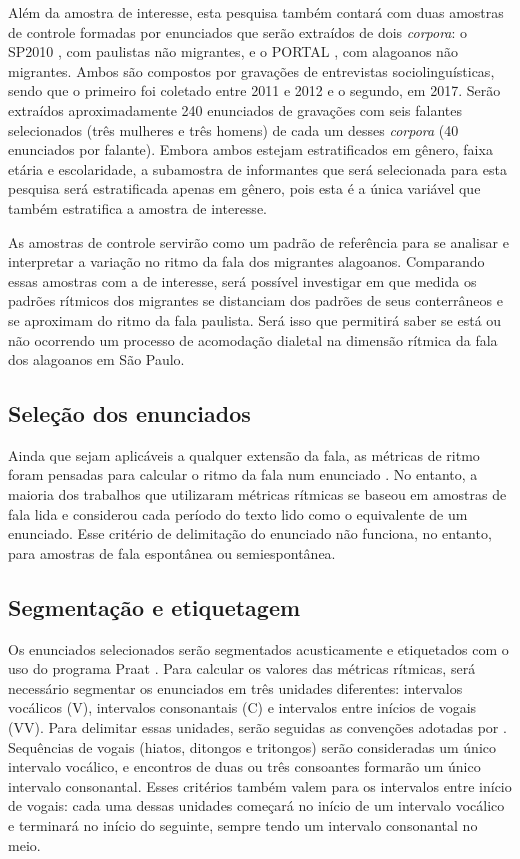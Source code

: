 \documentclass[
		a4paper,	%
		12pt,		%
		]{article}	%
\begin{document}
	Além da amostra de interesse, esta pesquisa também contará com duas amostras
	de controle formadas por enunciados que serão extraídos de dois
	\emph{corpora}: o SP2010 \citep{Mendes.Oushiro2012}, com paulistas não
	migrantes, e o PORTAL \citep{Oliveira2017}, com alagoanos não migrantes.
	Ambos são compostos por gravações de entrevistas sociolinguísticas, sendo
	que o primeiro foi coletado entre 2011 e 2012 e o segundo, em 2017. Serão
	extraídos aproximadamente 240 enunciados de gravações com seis falantes
	selecionados (três mulheres e três homens) de cada um desses \emph{corpora}
	(40 enunciados por falante). Embora ambos estejam estratificados em gênero,
	faixa etária e escolaridade, a subamostra de informantes que será
	selecionada para esta pesquisa será estratificada apenas em gênero, pois
	esta é a única variável que também estratifica a amostra de interesse.

	As amostras de controle servirão como um padrão de referência para se
	analisar e interpretar a variação no ritmo da fala dos migrantes alagoanos.
	Comparando essas amostras com a de interesse, será possível investigar em
	que medida os padrões rítmicos dos migrantes se distanciam dos padrões de
	seus conterrâneos e se aproximam do ritmo da fala paulista. Será isso que
	permitirá saber se está ou não ocorrendo um processo de acomodação dialetal
	na dimensão rítmica da fala dos alagoanos em São Paulo.
		
	\subsection{Seleção dos enunciados} \label{selecao}

	Ainda que sejam aplicáveis a qualquer extensão da fala, as métricas de ritmo
	foram pensadas para calcular o ritmo da fala num enunciado
	\citep{Fuchs2016}. No entanto, a maioria dos trabalhos que utilizaram
	métricas rítmicas se baseou em amostras de fala lida e considerou cada
	período do texto lido como o equivalente de um enunciado. Esse critério de
	delimitação do enunciado não funciona, no entanto, para amostras de fala
	espontânea ou semiespontânea.

	\subsection{Segmentação e etiquetagem} \label{segm}

	Os enunciados selecionados serão segmentados acusticamente e etiquetados com
	o uso do programa Praat \citep{Boersma.Weenink2019}. Para calcular os
	valores das métricas rítmicas, será necessário segmentar os enunciados em
	três unidades diferentes: intervalos vocálicos (V), intervalos consonantais
	(C) e intervalos entre inícios de vogais (VV). Para delimitar essas
	unidades,  serão seguidas as convenções adotadas por \citet{Ramus.etal1999}.
	Sequências de vogais (hiatos, ditongos e tritongos) serão consideradas um
	único intervalo vocálico, e encontros de duas ou três consoantes formarão um
	único intervalo consonantal. Esses critérios também valem para os intervalos
	entre início de vogais: cada uma dessas unidades começará no início de um
	intervalo vocálico e terminará no início do seguinte, sempre tendo um
	intervalo consonantal no meio.
\end{document}
